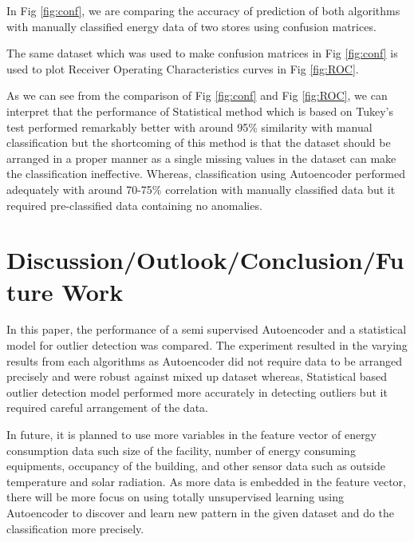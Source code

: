 \documentclass[conference]{IEEEtran}
\begin{document}
In Fig \ref{fig:conf}, we are comparing the accuracy of prediction of both algorithms with manually classified energy data of two stores using confusion matrices. 


The same dataset which was used to make confusion matrices in Fig \ref{fig:conf} is used to plot Receiver Operating Characteristics curves in Fig \ref{fig:ROC}.




As we can see from the comparison of Fig \ref{fig:conf} and Fig \ref{fig:ROC}, we can interpret that the performance of Statistical method which is based on Tukey's test performed remarkably better with around 95\% similarity with manual classification but the shortcoming of this method is that the dataset should be arranged in a proper manner as a single missing values in the dataset can make the classification ineffective. Whereas, classification using Autoencoder performed adequately with around 70-75\% correlation with manually classified data but it required pre-classified data containing no anomalies.  
 
 \section{Discussion/Outlook/Conclusion/Future Work}
 
 In this paper, the performance of a semi supervised Autoencoder and a statistical model for outlier detection was compared. The experiment resulted in the varying results from each algorithms as Autoencoder did not require data to be arranged precisely and were robust against mixed up dataset whereas, Statistical based outlier detection model performed more accurately in detecting outliers but it required careful arrangement of the data.
 
  
 In future, it is planned to use more variables in the feature vector of energy consumption data such size of the facility, number of energy consuming equipments, occupancy of the building, and other sensor data such as outside temperature and solar radiation. As more data is embedded in the feature vector, there will be more focus on using totally unsupervised learning using Autoencoder to discover and learn new pattern in the given dataset and do the classification more precisely. 
 
\end{document}

